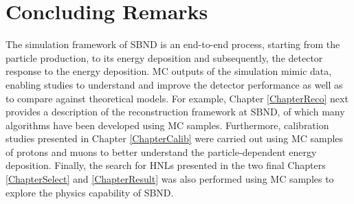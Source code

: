 \section{Concluding Remarks}
\label{sec:sim_concluding_remarks}

The simulation framework of SBND is an end-to-end process, starting from the particle production, to its energy deposition and subsequently, the detector response to the energy deposition.
MC outputs of the simulation mimic data, enabling studies to understand and improve the detector performance as well as to compare against theoretical models.
For example, Chapter \ref{ChapterReco} next provides a description of the reconstruction framework at SBND, of which many algorithms have been developed using MC samples.
Furthermore, calibration studies presented in Chapter \ref{ChapterCalib} were carried out using MC samples of protons and muons to better understand the particle-dependent energy deposition.
Finally, the search for HNLs presented in the two final Chapters \ref{ChapterSelect} and \ref{ChapterResult} was also performed using MC samples to explore the physics capability of SBND.
